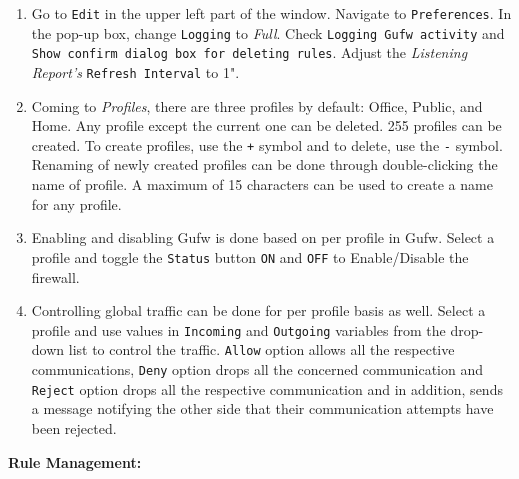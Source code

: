\documentclass[12pt]{extarticle}
\begin{document}
\begin{enumerate}

\item Go to \texttt{Edit} in the upper left part of the window. Navigate to \texttt{Preferences}. In the pop-up box, change \texttt{Logging} to \textit{Full}. Check \texttt{Logging Gufw activity} and \texttt{Show confirm dialog box for deleting rules}. Adjust the \textit{Listening Report's} \texttt{Refresh Interval} to 1".

\item Coming to \textit{Profiles}, there are three profiles by default: Office, Public, and Home. Any profile except the current one can be deleted. 255 profiles can be created. To create profiles, use the \texttt{+} symbol and to delete, use the \texttt{-} symbol. Renaming of newly created profiles can be done through double-clicking the name of profile. A maximum of 15 characters can be used to create a name for any profile. 

\item Enabling and disabling Gufw is done based on per profile in Gufw. Select a profile and toggle the \texttt{Status} button \texttt{ON} and \texttt{OFF} to Enable/Disable the firewall.

\item Controlling global traffic can be done for per profile basis as well. Select a profile and use values in \texttt{Incoming} and \texttt{Outgoing} variables from the drop-down list to control the traffic. \texttt{Allow} option allows all the respective communications, \texttt{Deny} option drops all the concerned communication and \texttt{Reject} option drops all the respective communication and in addition, sends a message notifying the other side that their communication attempts have been rejected.
\end{enumerate}

\item \textbf{Rule Management:}
\end{document}

